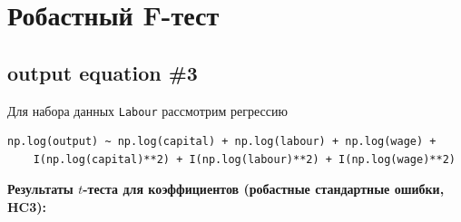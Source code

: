 \documentclass[
  russian,
]{article}
\begin{document}
\section{Робастный
F-тест}\label{ux440ux43eux431ux430ux441ux442ux43dux44bux439-f-ux442ux435ux441ux442}

\subsection{output equation \#3}\label{output-equation-3}

Для набора данных \texttt{Labour} рассмотрим регрессию

\begin{verbatim}
np.log(output) ~ np.log(capital) + np.log(labour) + np.log(wage) +
    I(np.log(capital)**2) + I(np.log(labour)**2) + I(np.log(wage)**2)
\end{verbatim}

\textbf{Результаты \(t\)-теста для коэффициентов (робастные стандартные
ошибки, HC3):}
\end{document}
